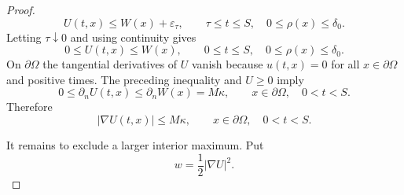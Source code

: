 \documentclass[10pt,a4paper]{amsart}
\begin{document}
\begin{proof}
\[
        U(t,x)\le W(x)+\varepsilon_\tau,
        \qquad \tau\le t\le S,
        \quad 0\le\rho(x)\le\delta_0.
\]
Letting $\tau\downarrow0$ and using continuity gives
\[
        0\le U(t,x)\le W(x),
        \qquad 0\le t\le S,
        \quad 0\le\rho(x)\le\delta_0.
\]
On $\partial\Omega$ the tangential derivatives of $U$ vanish because $u(t,x)=0$ for all $x\in\partial\Omega$ and positive times.  The preceding inequality and $U\ge0$ imply
\[
        0\le \partial_n U(t,x)\le \partial_n W(x)=M\kappa,
        \qquad x\in\partial\Omega,
        \quad 0<t<S.
\]
Therefore
\begin{equation}\label{eq:boundary-gradient-bound}
        |\nabla U(t,x)|\le M\kappa,
        \qquad x\in\partial\Omega,
        \quad 0<t<S.
\end{equation}

It remains to exclude a larger interior maximum.  Put
\[
        w=\frac12|\nabla U|^2.
\]


\end{proof}
\end{document}
